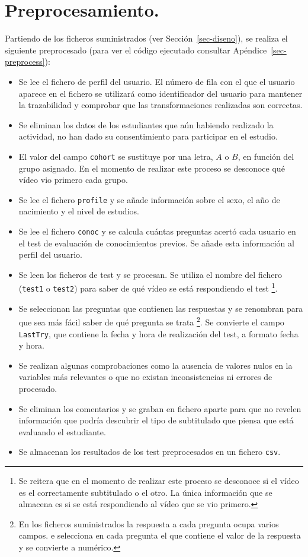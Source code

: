 \documentclass[
  12pt,
  a4paper,
  extrafontsizes,
  onecolumn,
  openright]{memoir}
\newlength{\rf}
\begin{document}
\hypertarget{sec-preprocesado}{%
\section{Preprocesamiento.}\label{sec-preprocesado}}

Partiendo de los ficheros suministrados (ver Sección~\ref{sec-diseno}),
se realiza el siguiente preprocesado (para ver el código ejecutado
consultar Apéndice~\ref{sec-preprocess}):

\begin{itemize}
\item
  Se lee el fichero de perfil del usuario. El número de fila con el que
  el usuario aparece en el fichero se utilizará como identificador del
  usuario para mantener la trazabilidad y comprobar que las
  transformaciones realizadas son correctas.
\item
  Se eliminan los datos de los estudiantes que aún habiendo realizado la
  actividad, no han dado su consentimiento para participar en el
  estudio.
\item
  El valor del campo \texttt{cohort} se sustituye por una letra, \(A\) o
  \(B\), en función del grupo asignado. En el momento de realizar este
  proceso se desconoce qué vídeo vio primero cada grupo.
\item
  Se lee el fichero \texttt{profile} y se añade información sobre el
  sexo, el año de nacimiento y el nivel de estudios.
\item
  Se lee el fichero \texttt{conoc} y se calcula cuántas preguntas acertó
  cada usuario en el test de evaluación de conocimientos previos. Se
  añade esta información al perfil del usuario.
\item
  Se leen los ficheros de test y se procesan. Se utiliza el nombre del
  fichero (\texttt{test1} o \texttt{test2}) para saber de qué vídeo se
  está respondiendo el test \footnote{Se reitera que en el momento de
    realizar este proceso se desconoce si el vídeo es el correctamente
    subtitulado o el otro. La única información que se almacena es si se
    está respondiendo al vídeo que se vio primero.}.
\item
  Se seleccionan las preguntas que contienen las respuestas y se
  renombran para que sea más fácil saber de qué pregunta se trata
  \footnote{En los ficheros suministrados la respuesta a cada pregunta
    ocupa varios campos. e selecciona en cada pregunta el que contiene
    el valor de la respuesta y se convierte a numérico.}. Se convierte
  el campo \texttt{LastTry}, que contiene la fecha y hora de realización
  del test, a formato fecha y hora.
\item
  Se realizan algunas comprobaciones como la ausencia de valores nulos
  en la variables más relevantes o que no existan inconsistencias ni
  errores de procesado.
\item
  Se eliminan los comentarios y se graban en fichero aparte para que no
  revelen información que podría descubrir el tipo de subtitulado que
  piensa que está evaluando el estudiante.
\item
  Se almacenan los resultados de los test preprocesados en un fichero
  \texttt{csv}.
\end{itemize}
\end{document}
